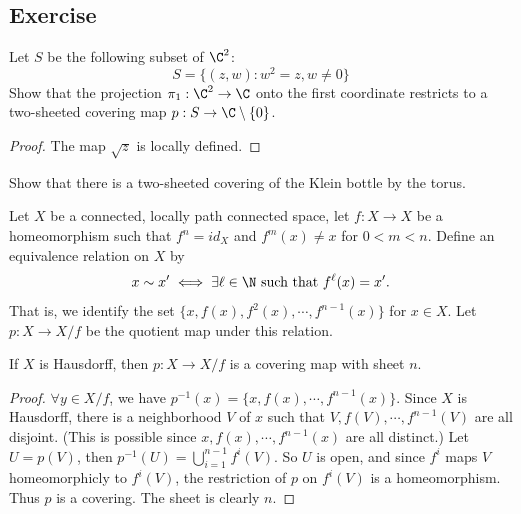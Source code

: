 \subsection{Exercise}
\begin{exercise}
Let $S$ be the following subset of $\C^2$:
\[S=\{(z,w):w^2=z,w\neq0\}\]
Show that the projection $\pi_1:\C^2\to\C$ onto the first coordinate restricts to a two-sheeted covering map $p:S\to\C\setminus\{0\}$.
\end{exercise}
\begin{proof}
The map $\sqrt{z}$ is locally defined.
\end{proof}
\begin{exercise}
Show that there is a two-sheeted covering of the Klein bottle by the torus.
\end{exercise}
\begin{lemma}
Let $X$ be a connected, locally path connected space, let $f:X\to X$ be a homeomorphism such that $f^n=id_X$ and $f^m(x)\neq x$ for $0<m<n$. Define an equivalence relation on $X$ by
\[x\sim x'\iff \exists\ell\in\N\text{ such that }f^\ell(x)=x'.\]
That is, we identify the set $\{x,f(x),f^2(x),\cdots,f^{n-1}(x)\}$ for $x\in X$. Let $p:X\to X/f$ be the quotient map under this relation.\par
If $X$ is Hausdorff, then $p:X\to X/f$ is a covering map with sheet $n$.
\end{lemma}
\begin{proof}
$\forall y\in X/f$, we have $p^{-1}(x)=\{x,f(x),\cdots,f^{n-1}(x)\}$. Since $X$ is Hausdorff, there is a neighborhood $V$ of $x$ such that $V,f(V),\cdots,f^{n-1}(V)$ are all disjoint. (This is possible since $x,f(x),\cdots,f^{n-1}(x)$ are all distinct.) Let $U=p(V)$, then $p^{-1}(U)=\bigcup_{i=1}^{n-1}f^i(V)$. So $U$ is open, and since $f^i$ maps $V$ homeomorphicly to $f^i(V)$, the restriction of $p$ on $f^i(V)$ is a homeomorphism. Thus $p$ is a covering. The sheet is clearly $n$.
\end{proof}
